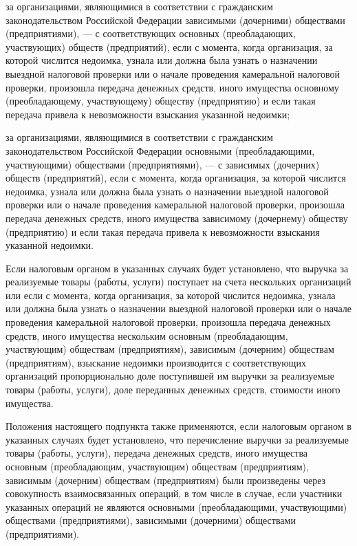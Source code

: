 \documentclass[a4page]{report}
\begin{document}
\par за организациями, являющимися в соответствии с гражданским законодательством Российской Федерации зависимыми (дочерними) обществами (предприятиями), --- с соответствующих основных (преобладающих, участвующих) обществ (предприятий), если с момента, когда организация, за которой числится недоимка, узнала или должна была узнать о назначении выездной налоговой проверки или о начале проведения камеральной налоговой проверки, произошла передача денежных средств, иного имущества основному (преобладающему, участвующему) обществу (предприятию) и если такая передача привела к невозможности взыскания указанной недоимки;
\par за организациями, являющимися в соответствии с гражданским законодательством Российской Федерации основными (преобладающими, участвующими) обществами (предприятиями), --- с зависимых (дочерних) обществ (предприятий), если с момента, когда организация, за которой числится недоимка, узнала или должна была узнать о назначении выездной налоговой проверки или о начале проведения камеральной налоговой проверки, произошла передача денежных средств, иного имущества зависимому (дочернему) обществу (предприятию) и если такая передача привела к невозможности взыскания указанной недоимки.
\par Если налоговым органом в указанных случаях будет установлено, что выручка за реализуемые товары (работы, услуги) поступает на счета нескольких организаций или если с момента, когда организация, за которой числится недоимка, узнала или должна была узнать о назначении выездной налоговой проверки или о начале проведения камеральной налоговой проверки, произошла передача денежных средств, иного имущества нескольким основным (преобладающим, участвующим) обществам (предприятиям), зависимым (дочерним) обществам (предприятиям), взыскание недоимки производится с соответствующих организаций пропорционально доле поступившей им выручки за реализуемые товары (работы, услуги), доле переданных денежных средств, стоимости иного имущества.
\par Положения настоящего подпункта также применяются, если налоговым органом в указанных случаях будет установлено, что перечисление выручки за реализуемые товары (работы, услуги), передача денежных средств, иного имущества основным (преобладающим, участвующим) обществам (предприятиям), зависимым (дочерним) обществам (предприятиям) были произведены через совокупность взаимосвязанных операций, в том числе в случае, если участники указанных операций не являются основными (преобладающими, участвующими) обществами (предприятиями), зависимыми (дочерними) обществами (предприятиями).
\end{document}
